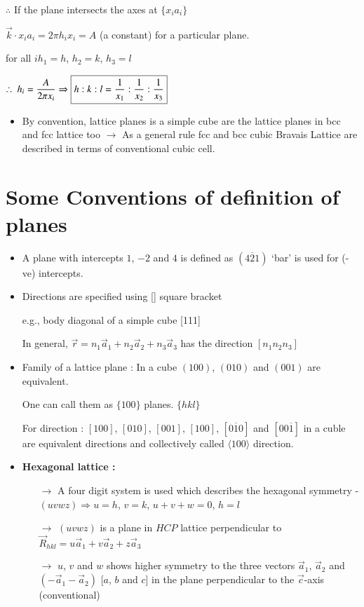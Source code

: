 $\therefore$ If the plane intersects the axes at $\{x_{i}a_{i}\}$

$\overrightarrow{k}\cdot x_{i}a_{i}=2\pi h_{i}x_{i}=A$ (a constant) for a particular plane.

for all $i$\qquad $h_{1}=h$, $h_{2}=k$, $h_{3}=l$

$\therefore \ h_{i}=\dfrac{A}{2\pi x_{i}}\Rightarrow \fbox{$h:k:l=\dfrac{1}{x_{1}}: \dfrac{1}{x_{2}} : \dfrac{1}{x_{3}}$}$ 
\begin{itemize}
\item By convention, lattice planes is a simple cube are the lattice planes in bcc and fcc lattice too $\to$ As a general rule fcc and bcc cubic Bravais Lattice are described in terms of conventional cubic cell.
\end{itemize}

\section*{Some Conventions of definition of planes}
\begin{itemize}
\item A plane with intercepts $1$, $-2$ and $4$ is defined as $(4\overline{2}1)$ `bar' is used for (-ve) intercepts.

\item Directions are specified using [\quad] square bracket 

e.g., body diagonal of a simple cube [111]

In general, $\overrightarrow{r}=n_{1}\overrightarrow{a}_{1}+n_{2}\overrightarrow{a}_{2}+n_{3}\overrightarrow{a}_{3}$ has the direction $[n_{1}n_{2}n_{3}]$

\item Family of a lattice plane : In a cube $(100)$, $(010)$ and $(001)$ are equivalent.

One can call them as $\{100\}$ planes. $\{hkl\}$

For direction : $[100]$, $[010]$, $[001]$, $[100]$, $[0\overline{1}0]$ and $[00\overline{1}]$ in a cuble are equivalent directions and collectively called $\langle 100\rangle$ direction.

\item {\bf Hexagonal lattice : }
\begin{itemize}
\item[$\to$] A four digit system is used which describes the hexagonal symmetry - $(uvwz)\Rightarrow u=h$, $v=k$, $u+v+w=0$, $h=l$

\item[$\to$] $(uvwz)$ is a plane in $HCP$ lattice perpendicular to $\overrightarrow{R}_{hkl}=u\overrightarrow{a}_{1}+v\overrightarrow{a}_{2}+z\overrightarrow{a}_{3}$

\item[$\to$] $u$, $v$ and $w$ shows higher symmetry to the three vectors $\overrightarrow{a}_{1}$, $\overrightarrow{a}_{2}$ and $(-\overrightarrow{a}_{1}-\overrightarrow{a}_{2})$ [$a$, $b$ and $c$] in the plane perpendicular to the $\overrightarrow{c}$-axis (conventional)
\end{itemize}
\end{itemize}

